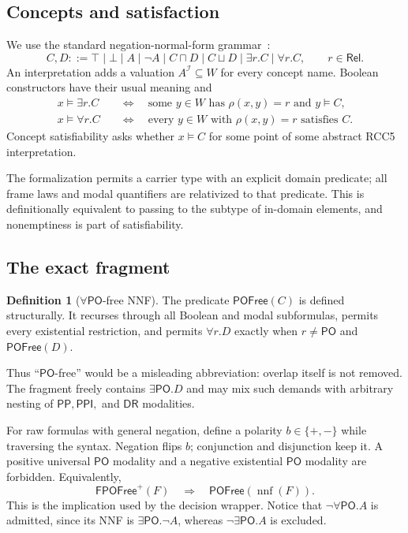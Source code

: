 \documentclass[11pt]{article}
\theoremstyle{plain}
\theoremstyle{definition}
\newtheorem{definition}[theorem]{Definition}
\theoremstyle{remark}
\newcommand{\Rel}{\ensuremath{\mathsf{Rel}}}
\newcommand{\PP}{\ensuremath{\mathsf{PP}}}
\newcommand{\PPI}{\ensuremath{\mathsf{PPI}}}
\newcommand{\PO}{\ensuremath{\mathsf{PO}}}
\newcommand{\DR}{\ensuremath{\mathsf{DR}}}
\newcommand{\POFree}{\ensuremath{\mathsf{POFree}}}
\newcommand{\FPOFree}{\ensuremath{\mathsf{FPOFree}}}
\begin{document}
\subsection{Concepts and satisfaction}

We use the standard negation-normal-form grammar~\cite{BaaderEtAl2007}:
\[
 C,D ::= \top\mid\bot\mid A\mid\neg A\mid C\sqcap D\mid C\sqcup D
        \mid\exists r.C\mid\forall r.C,
 \qquad r\in\Rel.
\]
An interpretation adds a valuation $A^{\mathcal I}\subseteq W$ for every
concept name.  Boolean constructors have their usual meaning and
\begin{align*}
 x\models\exists r.C
   &\quad\Longleftrightarrow\quad
     \text{some }y\in W\text{ has }\rho(x,y)=r\text{ and }y\models C,\\
 x\models\forall r.C
   &\quad\Longleftrightarrow\quad
     \text{every }y\in W\text{ with }\rho(x,y)=r\text{ satisfies }C.
\end{align*}
Concept satisfiability asks whether $x\models C$ for some point of some
abstract RCC5 interpretation.

The formalization permits a carrier type with an explicit domain predicate;
all frame laws and modal quantifiers are relativized to that predicate.  This
is definitionally equivalent to passing to the subtype of in-domain elements,
and nonemptiness is part of satisfiability.

\subsection{The exact fragment}

\begin{definition}[$\forall\PO$-free NNF]
The predicate $\POFree(C)$ is defined structurally.  It recurses through all
Boolean and modal subformulas, permits every existential restriction, and
permits $\forall r.D$ exactly when $r\neq\PO$ and $\POFree(D)$.
\end{definition}

Thus ``$\PO$-free'' would be a misleading abbreviation: overlap itself is
not removed.  The fragment freely contains $\exists\PO.D$ and may mix such
demands with arbitrary nesting of $\PP,\PPI,$ and $\DR$ modalities.

For raw formulas with general negation, define a polarity $b\in\{+,-\}$ while
traversing the syntax.  Negation flips $b$; conjunction and disjunction keep
it.  A positive universal $\PO$ modality and a negative existential $\PO$
modality are forbidden.  Equivalently,
\[
  \FPOFree^+(F) \quad\Longrightarrow\quad
  \POFree(\operatorname{nnf}(F)).
\]
This is the implication used by the decision wrapper.  Notice that
$\neg\forall\PO.A$ is admitted, since its NNF is $\exists\PO.\neg A$,
whereas $\neg\exists\PO.A$ is excluded.
\end{document}
